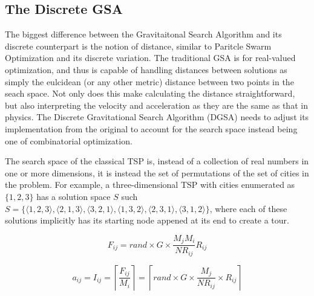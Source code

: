 \documentclass{article}
\begin{document}
\clearpage
\newpage

    \subsection{The Discrete GSA}

        The biggest difference between the Gravitaitonal Search Algorithm and its discrete counterpart is the notion of distance, similar to Paritcle Swarm Optimization and its discrete variation.  The traditional GSA is for real-valued optimization, and thus is capable of handling distances between solutions as simply the eulcidean (or any other metric) distance between two points in the seach space.  Not only does this make calculating the distance straightforward, but also interpreting the velocity and acceleration as they are the same as that in physics.  The Discrete Gravitational Search Algorithm (DGSA) needs to adjust its implementation from the original to account for the search space instead being one of combinatorial optimization.

        The search space of the classical TSP is, instead of a collection of real numbers in one or more dimensions, it is instead the set of permutations of the set of cities in the problem.  For example, a three-dimensional TSP with cities enumerated as $\{1,2,3\}$ has a solution space $S$ such $S = \{\langle 1,2,3 \rangle, \langle 2,1,3 \rangle, \langle 3,2,1 \rangle, \langle 1,3,2 \rangle, \langle 2,3,1\rangle, \langle 3,1,2 \rangle\}$, where each of these solutions implicitly has its starting node appened at its end to create a tour.

        

        \begin{equation} \label{eq:force}
            F_{ij} = rand \times G \times \frac{M_j M_i}{NR_{ij}} R_{ij}
        \end{equation}

        \begin{equation} \label{eq:dml}
            a_{ij} = I_{ij} = \left\lceil \frac{F_{ij}}{M_i} \right\rceil = \left\lceil rand \times G \times \frac{M_j}{NR_{ij}} \times R_{ij} \right\rceil
        \end{equation}
\end{document}

